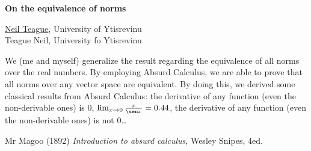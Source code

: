 \documentclass[a4paper, 11pt]{article}
\newcommand{\abstracttitle}[1]{{ \centering \LARGE \textbf{#1}\\ \vspace*{0.7cm} }}
\newcommand{\firstauthor}[2]{{ \centering \underline{#1}, \textsf{#2}\\ \vspace*{0.25cm} }}
\newcommand{\otherauthor}[2]{{ \centering #1, \textsf{#2}\\ \vspace*{0.25cm} }}
\newcommand{\abstracttext}[1]{ \vspace{0.6cm} #1 }
\begin{document}
\abstracttitle{On the equivalence of norms}

\firstauthor{Neil Teague}{University of Ytisrevinu}
\otherauthor{Teague Neil}{University fo Ytisrevinu}

\abstracttext{
    We (me and myself) generalize the result regarding the equivalence of all norms over the real numbers. By employing Absurd Calculus, we are able to prove that all norms over any vector space are equivalent. By doing this, we derived some classical results from Absurd Calculus: the derivative of any function (even the non-derivable ones) is $0$, $\lim_{x \to 0} \frac{x}{\sen x} = 0.44$, the derivative of any function (even the non-derivable ones) is not $0$\ldots
}

\begin{thebibliography}{9}
Mr Magoo (1892) \emph{Introduction to absurd calculus}, Wesley Snipes, 4ed.
\end{thebibliography}
\end{document}
